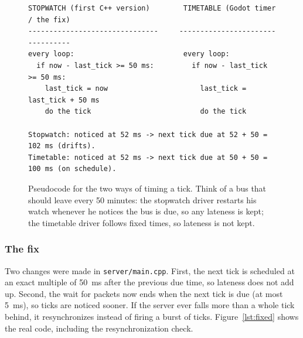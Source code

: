 \begin{figure}[H]
\begin{lstlisting}[language={}]
STOPWATCH (first C++ version)        TIMETABLE (Godot timer / the fix)
-------------------------------     ---------------------------------
every loop:                          every loop:
  if now - last_tick >= 50 ms:         if now - last_tick >= 50 ms:
    last_tick = now                      last_tick = last_tick + 50 ms
    do the tick                          do the tick

Stopwatch: noticed at 52 ms -> next tick due at 52 + 50 = 102 ms (drifts).
Timetable: noticed at 52 ms -> next tick due at 50 + 50 = 100 ms (on schedule).
\end{lstlisting}
\caption{Pseudocode for the two ways of timing a tick. Think of a bus that should leave every 50 minutes: the stopwatch driver restarts his watch whenever he notices the bus is due, so any lateness is kept; the timetable driver follows fixed times, so lateness is not kept.}
\label{lst:pseudo}
\end{figure}

\subsubsection{The fix}\label{sec:thefix}
Two changes were made in \texttt{server/main.cpp}. First, the next tick is scheduled at an exact multiple of 50~ms after the previous due time, so lateness does not add up. Second, the wait for packets now ends when the next tick is due (at most 5~ms), so ticks are noticed sooner. If the server ever falls more than a whole tick behind, it resynchronizes instead of firing a burst of ticks. Figure~\ref{lst:fixed} shows the real code, including the resynchronization check.

